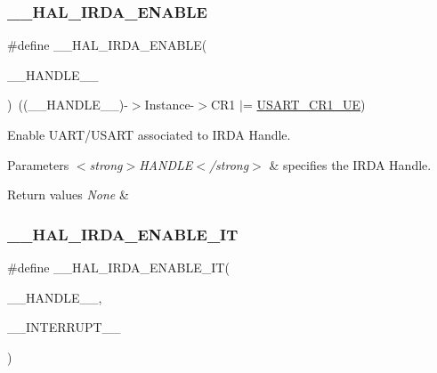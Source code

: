 \subsubsection{\texorpdfstring{\+\_\+\+\_\+\+H\+A\+L\+\_\+\+I\+R\+D\+A\+\_\+\+E\+N\+A\+B\+LE}{\_\_HAL\_IRDA\_ENABLE}}
{\footnotesize\ttfamily \#define \+\_\+\+\_\+\+H\+A\+L\+\_\+\+I\+R\+D\+A\+\_\+\+E\+N\+A\+B\+LE(\begin{DoxyParamCaption}\item[{}]{\+\_\+\+\_\+\+H\+A\+N\+D\+L\+E\+\_\+\+\_\+ }\end{DoxyParamCaption})~((\+\_\+\+\_\+\+H\+A\+N\+D\+L\+E\+\_\+\+\_\+)-\/$>$Instance-\/$>$C\+R1 $\vert$=  \hyperlink{group___peripheral___registers___bits___definition_ga2bb650676aaae4a5203f372d497d5947}{U\+S\+A\+R\+T\+\_\+\+C\+R1\+\_\+\+UE})}



Enable U\+A\+R\+T/\+U\+S\+A\+RT associated to I\+R\+DA Handle. 


\begin{DoxyParams}{Parameters}
{\em $<$strong$>$\+H\+A\+N\+D\+L\+E$<$/strong$>$} & specifies the I\+R\+DA Handle. \\
\hline
\end{DoxyParams}

\begin{DoxyRetVals}{Return values}
{\em None} & \\
\hline
\end{DoxyRetVals}
\mbox{\label{group___i_r_d_a___exported___macros_gae9ccdc86c1bcb8ed3857474d8c3823fa}} 
\subsubsection{\texorpdfstring{\+\_\+\+\_\+\+H\+A\+L\+\_\+\+I\+R\+D\+A\+\_\+\+E\+N\+A\+B\+L\+E\+\_\+\+IT}{\_\_HAL\_IRDA\_ENABLE\_IT}}
{\footnotesize\ttfamily \#define \+\_\+\+\_\+\+H\+A\+L\+\_\+\+I\+R\+D\+A\+\_\+\+E\+N\+A\+B\+L\+E\+\_\+\+IT(\begin{DoxyParamCaption}\item[{}]{\+\_\+\+\_\+\+H\+A\+N\+D\+L\+E\+\_\+\+\_\+,  }\item[{}]{\+\_\+\+\_\+\+I\+N\+T\+E\+R\+R\+U\+P\+T\+\_\+\+\_\+ }\end{DoxyParamCaption})}

